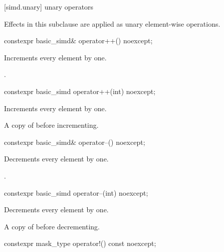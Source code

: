 [simd.unary]{ unary operators}

\pnum
Effects in this subclause are applied as unary element-wise operations.

\begin{itemdecl}
constexpr basic_simd& operator++() noexcept;
\end{itemdecl}

\begin{itemdescr}
  \pnum{}

  \pnum\effects
  Increments every element by one.

  \pnum\returns
  .
\end{itemdescr}

\begin{itemdecl}
constexpr basic_simd operator++(int) noexcept;
\end{itemdecl}

\begin{itemdescr}
  \pnum{}

  \pnum\effects
  Increments every element by one.

  \pnum\returns
  A copy of  before incrementing.
\end{itemdescr}

\begin{itemdecl}
constexpr basic_simd& operator--() noexcept;
\end{itemdecl}

\begin{itemdescr}
  \pnum{}

  \pnum\effects
  Decrements every element by one.

  \pnum\returns
  .
\end{itemdescr}

\begin{itemdecl}
constexpr basic_simd operator--(int) noexcept;
\end{itemdecl}

\begin{itemdescr}
  \pnum{}

  \pnum\effects
  Decrements every element by one.

  \pnum\returns
  A copy of  before decrementing.
\end{itemdescr}

\begin{itemdecl}
constexpr mask_type operator!() const noexcept;
\end{itemdecl}

